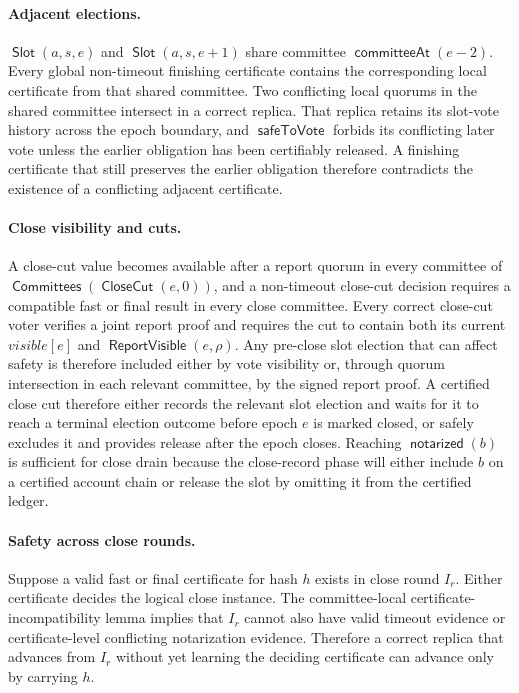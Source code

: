 \documentclass[sigplan,twocolumn,review,anonymous]{acmart}
\newcommand{\func}[1]{\operatorname{\mathsf{#1}}}
\newcommand{\Slot}{\func{Slot}}
\newcommand{\CloseCut}{\func{CloseCut}}
\newcommand{\notarized}{\func{notarized}}
\newcommand{\committeeAt}{\func{committeeAt}}
\newcommand{\Committees}{\func{Committees}}
\newcommand{\safeToVote}{\func{safeToVote}}
\newcommand{\ReportVisible}{\func{ReportVisible}}
\begin{document}
\paragraph{Adjacent elections.}
\(\Slot(a,s,e)\) and \(\Slot(a,s,e+1)\) share committee \(\committeeAt(e-2)\).  Every global
non-timeout finishing certificate contains the corresponding local certificate from that shared
committee.  Two conflicting local quorums in the shared committee intersect in a correct replica.
That replica retains its slot-vote history across the epoch boundary, and
\(\safeToVote\) forbids its conflicting later vote unless the earlier obligation has been
certifiably released.  A finishing certificate that still preserves the earlier obligation therefore
contradicts the existence of a conflicting adjacent certificate.

\paragraph{Close visibility and cuts.}
A close-cut value becomes available after a report quorum in every committee of
\(\Committees(\CloseCut(e,0))\), and a non-timeout close-cut decision requires a compatible fast
or final result in every close committee.  Every correct close-cut voter verifies a joint report proof and
requires the cut to contain both its current \(visible[e]\) and \(\ReportVisible(e,\rho)\).  Any
pre-close slot election that can affect safety is therefore included either by vote visibility or,
through quorum intersection in each relevant committee, by the signed report proof.  A certified close
cut therefore either records the relevant slot election and waits for it to reach a terminal election
outcome before epoch \(e\) is marked closed, or safely excludes it and provides release after the epoch
closes.  Reaching \(\notarized(b)\) is sufficient for close drain because the close-record phase will
either include \(b\) on a certified account chain or release the slot by omitting it from the certified
ledger.

\paragraph{Safety across close rounds.}
Suppose a valid fast or final certificate for hash \(h\) exists in close round \(I_r\).  Either
certificate decides the logical close instance.  The committee-local certificate-incompatibility lemma
implies that \(I_r\) cannot also have valid timeout evidence or certificate-level conflicting
notarization evidence.  Therefore a correct replica that advances from \(I_r\) without yet learning
the deciding certificate can advance only by carrying \(h\).
\end{document}
